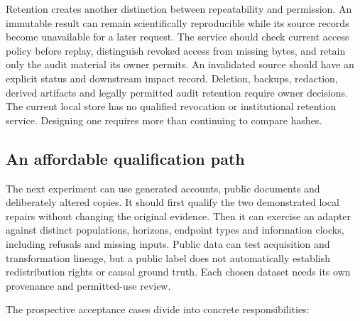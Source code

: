 Retention creates another distinction between repeatability and
permission. An immutable result can remain scientifically reproducible
while its source records become unavailable for a later request. The
service should check current access policy before replay, distinguish
revoked access from missing bytes, and retain only the audit material
its owner permits. An invalidated source should have an explicit status
and downstream impact record. Deletion, backups, redaction, derived
artifacts and legally permitted audit retention require owner decisions.
The current local store has no qualified revocation or institutional
retention service. Designing one requires more than continuing to
compare hashes.\citep{exec14_custody_design}

\hypertarget{an-affordable-qualification-path}{%
\subsection{An affordable qualification
path}\label{an-affordable-qualification-path}}

The next experiment can use generated accounts, public documents and
deliberately altered copies. It should first qualify the two
demonstrated local repairs without changing the original evidence. Then
it can exercise an adapter against distinct populations, horizons,
endpoint types and information clocks, including refusals and missing
inputs. Public data can test acquisition and transformation lineage, but
a public label does not automatically establish redistribution rights or
causal ground truth. Each chosen dataset needs its own provenance and
permitted-use review.

The prospective acceptance cases divide into concrete responsibilities:

